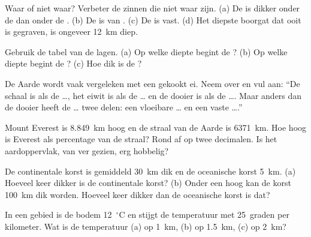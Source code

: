 \begin{exercise}[$\star$]\label{exo:g6:inside-the-earth:2}
Waar of niet waar? Verbeter de zinnen die niet waar zijn.
(a) De  is dikker onder de  dan onder de .
(b) De  is van .
(c) De  is vast.
(d) Het diepste boorgat dat ooit is gegraven, is ongeveer 12~km diep.
\end{exercise}

\begin{exercise}[$\star$]\label{exo:g6:inside-the-earth:3}
Gebruik de tabel van de lagen. (a) Op welke diepte begint de ?
(b) Op welke diepte begint de ? (c) Hoe dik is de ?
\end{exercise}

\begin{exercise}[$\star$]\label{exo:g6:inside-the-earth:4}
De Aarde wordt vaak vergeleken met een gekookt ei. Neem over en vul aan:
``De schaal is als de \ldots, het eiwit is als de \ldots{} en de dooier is
als de \ldots{}. Maar anders dan de dooier heeft de \ldots{} twee delen: een
vloeibare \ldots{} en een vaste \ldots{}.''
\end{exercise}

\begin{exercise}[$\star\star$]\label{exo:g6:inside-the-earth:5}
Mount Everest is 8.849~km hoog en de straal van de Aarde is 6371~km.
Hoe hoog is Everest als percentage van de straal? Rond af op twee
decimalen. Is het aardoppervlak, van ver gezien, erg hobbelig?
\end{exercise}

\begin{exercise}[$\star\star$]\label{exo:g6:inside-the-earth:6}
De continentale korst is gemiddeld 30~km dik en de oceanische korst 5~km.
(a) Hoeveel keer dikker is de continentale korst? (b) Onder een hoog
 kan de korst 100~km dik worden. Hoeveel keer dikker dan de
oceanische korst is dat?
\end{exercise}

\begin{exercise}[$\star\star$]\label{exo:g6:inside-the-earth:7}
In een gebied is de bodem 12~$^\circ$C en stijgt de temperatuur met
25~graden per kilometer. Wat is de temperatuur (a) op 1~km, (b) op
1.5~km, (c) op 2~km?
\end{exercise}

